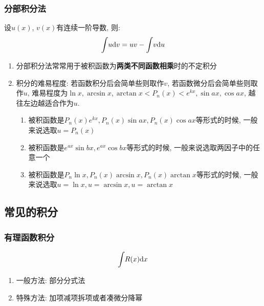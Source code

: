\subsubsection{分部积分法}
设$ u(x) $, $ v(x) $有连续一阶导数, 则:
\begin{equation*}
\displaystyle\int_{}\hspace{.2em}u \mathrm{d}v=uv-\displaystyle\int_{}\hspace{.2em}v \mathrm{d}u
\end{equation*}
\begin{tcolorbox}
\begin{enumerate}
\item 分部积分法常常用于被积函数为\textbf{两类不同函数相乘}时的不定积分
\item 积分的难易程度: 若函数积分后会简单些则取作$ v $, 若函数微分后会简单些则取作$ u $, 难易程度为$ \ln x, \arcsin x, \arctan x<P_{n}(x)<e^{kx}, \sin ax, \cos ax $, 越往左边越适合作为$ u $.
\begin{enumerate}
\item 被积函数是$ P_{n}(x)e^{kx}, P_{n}(x)\sin ax, P_{n}(x)\cos ax $等形式的时候, 一般来说选取$ u=P_{n}(x) $
\item 被积函数是$ e^{ax}\sin bx, e^{ax}\cos bx $等形式的时候, 一般来说选取两因子中的任意一个
\item 被积函数是$ P_{n}\ln x, P_{n}(x)\arcsin x, P_{n}(x)\arctan x $等形式的时候, 一般来说选取$ u=\ln x, u=\arcsin x, u=\arctan x $
\end{enumerate}
\end{enumerate}
\end{tcolorbox}
\subsection{常见的积分}
\subsubsection{有理函数积分}
\begin{equation*}
\displaystyle\int_{}\hspace{.2em}R(x)\mathrm{d}x
\end{equation*}\par
\begin{enumerate}
\item 一般方法: 部分分式法
\item 特殊方法: 加项减项拆项或者凑微分降幂
\end{enumerate}
